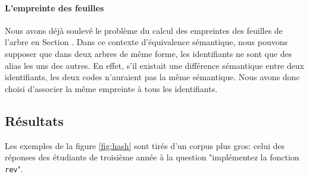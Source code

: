\paragraph{L'empreinte des feuilles}
Nous avons déjà soulevé le problème du calcul des empreintes des feuilles de l'arbre en Section . Dans ce contexte d'équivalence sémantique, nous pouvons supposer que dans deux arbres de même forme, les identifiants ne sont que des alias les uns des autres. En effet, s'il existait une différence sémantique entre deux identifiants, les deux codes n'auraient pas la même sémantique.
Nous avons donc choisi d'associer la même empreinte à tous les identifiants.

\subsection{Résultats}

Les exemples de la figure \ref{fig:hash} sont tirés d'un corpus plus gros: celui des réponses des étudiants de troisième année à la question "implémentez la fonction \verb|rev|".

